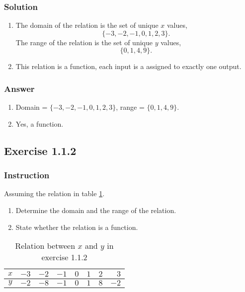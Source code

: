 \documentclass[11pt, letterpaper, oneside]{memoir}
\begin{document}
\subsubsection{Solution}

\begin{enumerate}[label=(\alph*)]
  \item The domain of the relation is the set of unique $ x $ values,
    $$ \phantom{.}
    \{ -3, -2, -1, 0, 1, 2, 3 \}
    .$$
    The range of the relation is the set of unique $ y $ values,
    $$ \phantom{.}
    \{ 0, 1, 4, 9 \}
    .$$
  \item This relation is a function, each input is a assigned to exactly one output.
\end{enumerate}

\subsubsection{Answer}

\begin{enumerate}[label=(\alph*)]
  \item Domain = $ \{ -3, -2, -1, 0, 1, 2, 3 \} $, range = $ \{ 0, 1, 4, 9 \} $.
  \item Yes, a function.
\end{enumerate}

\subsection*{Exercise 1.1.2}

\subsubsection{Instruction}

Assuming the relation in table \ref{table:exercise-1.1.2}.
\begin{enumerate}[label=(\alph*)]
  \item Determine the domain and the range of the relation.
  \item State whether the relation is a function.
\end{enumerate}

\begin{table}[ht]
  \centering
  \begin{tabular}{ c | r r r r r r r }
    \hline
    $ x $ & $ -3 $ & $ -2 $ & $ -1 $ & $ 0 $ & $ 1 $ & $ 2 $ & $ 3 $ \\
    \hline
    $ y $ & $ -2 $ & $ -8 $ & $ -1 $ & $ 0 $ & $ 1 $ & $ 8 $ & $ -2 $ \\
    \hline
  \end{tabular}
  \caption{Relation between $ x $ and $ y $ in exercise 1.1.2}
  \label{table:exercise-1.1.2}
\end{table}
\end{document}
